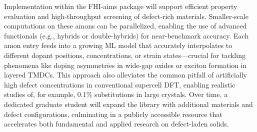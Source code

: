 \documentclass[11pt,english,calcwidth,compact]{nserc-appendix}
\begin{document}
Implementation within the FHI-aims package will support efficient property evaluation and high-throughput screening of defect-rich materials. Smaller-scale computations on these amons can be parallelized, enabling the use of advanced functionals (e.g., hybrids or double-hybrids) for near-benchmark accuracy. Each amon entry feeds into a growing ML model that accurately interpolates to different dopant positions, concentrations, or strain states—crucial for tackling phenomena like doping asymmetries in wide-gap oxides or exciton formation in layered TMDCs. This approach also alleviates the common pitfall of artificially high defect concentrations in conventional supercell DFT, enabling realistic studies of, for example, 0.1\% substitutions in large crystals. Over time, a dedicated graduate student will expand the library with additional materials and defect configurations, culminating in a publicly accessible resource that accelerates both fundamental and applied research on defect-laden solids.
\end{document}
